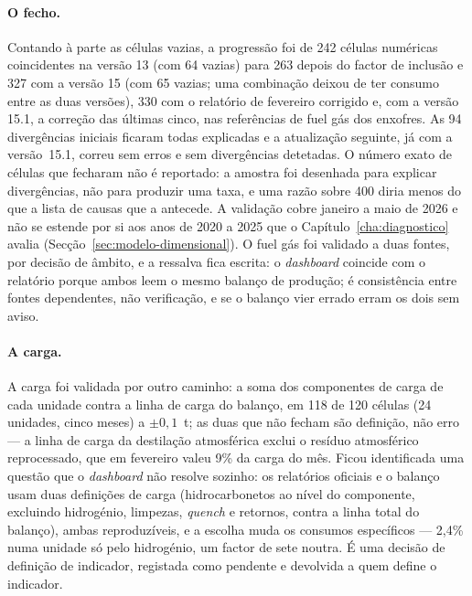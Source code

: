 \paragraph{O fecho.} Contando à parte as células vazias, a progressão foi
de 242 células numéricas coincidentes na versão 13 (com 64 vazias) para 263
depois do factor de inclusão e 327 com a versão 15 (com 65 vazias; uma
combinação deixou de ter consumo entre as duas versões), 330 com o
relatório de fevereiro corrigido e, com a versão 15.1, a correção das
últimas cinco, nas referências de fuel gás dos enxofres. As 94 divergências
iniciais ficaram todas explicadas e a atualização seguinte, já com a
versão~15.1, correu sem erros e sem divergências detetadas. O número exato
de células que fecharam não é reportado: a amostra foi desenhada para
explicar divergências, não para produzir uma taxa, e uma razão sobre 400
diria menos do que a lista de causas que a antecede. A
validação cobre janeiro a maio de 2026 e não se estende por si aos anos de
2020 a 2025 que o Capítulo~\ref{cha:diagnostico} avalia
(Secção~\ref{sec:modelo-dimensional}).
O fuel gás foi validado a duas fontes, por decisão de âmbito, e a
ressalva fica escrita: o \emph{dashboard} coincide com o relatório porque
ambos leem o mesmo balanço de produção; é consistência entre fontes
dependentes, não verificação, e se o balanço vier errado erram os dois
sem aviso.

\paragraph{A carga.} A carga foi validada por outro caminho: a soma dos
componentes de carga de cada unidade contra a linha de carga do balanço,
em 118 de 120 células (24 unidades, cinco meses) a $\pm0{,}1$~t; as duas
que não fecham são definição, não erro --- a linha de carga da destilação
atmosférica exclui o resíduo atmosférico reprocessado, que em fevereiro
valeu 9\% da carga do mês. Ficou identificada uma questão que o
\emph{dashboard} não resolve sozinho: os relatórios oficiais e o balanço
usam duas definições de carga (hidrocarbonetos ao nível do componente,
excluindo hidrogénio, limpezas, \emph{quench} e retornos, contra a linha
total do balanço), ambas reproduzíveis, e a escolha muda os consumos
específicos --- 2,4\% numa unidade só pelo hidrogénio, um factor de sete
noutra. É uma decisão de definição de indicador, registada como pendente
e devolvida a quem define o indicador.

